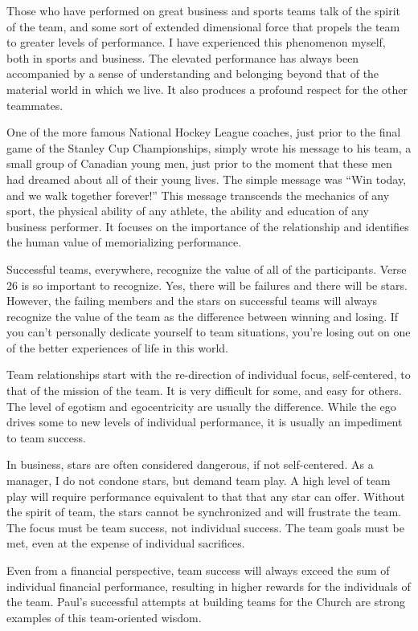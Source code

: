 \documentclass[12pt]{memoir}
\begin{document}
Those who have performed on great business and sports teams talk of
the spirit of the team, and some sort of extended dimensional
force that propels the team to greater levels of performance. I have
experienced this phenomenon myself, both in sports and business. The
elevated performance has always been accompanied by a sense of understanding
and belonging beyond that of the material world in which we live.
It also produces a profound respect for the other teammates.

One of the more famous National Hockey League coaches, just prior
to the final game of the Stanley Cup Championships, simply wrote his
message to his team, a small group of Canadian young men, just prior
to the moment that these men had dreamed about all of their young
lives. The simple message was ``Win today, and we walk together forever!''
This message transcends the mechanics of any sport, the physical ability
of any athlete, the ability and education of any business performer.
It focuses on the importance of the relationship and identifies the
human value of memorializing performance.

Successful teams, everywhere, recognize the value of all of the participants.
Verse 26 is so important to recognize. Yes, there will be failures and there will be stars. However, the failing members and the
stars on successful teams will always recognize the value of the team as the difference between winning and losing. If you can't
personally dedicate yourself to team situations, you're losing out
on one of the better experiences of life in this world.

Team relationships start with the re-direction of individual focus,
self-centered, to that of the mission of the team. It is very difficult
for some, and easy for others. The level of egotism and egocentricity
are usually the difference. While the ego drives some to new levels
of individual performance, it is usually an impediment to team success.

In business, stars are often considered dangerous, if not self-centered.
As a manager, I do not condone stars, but demand
team play. A high level of team play will require performance equivalent
to that that any star can offer. Without the spirit of team, the stars cannot be synchronized and will frustrate
the team. The focus must be team success, not individual success.
The team goals must be met, even at the expense of individual sacrifices.

Even from a financial perspective, team success will always exceed
the sum of individual financial performance, resulting in higher rewards
for the individuals of the team.
Paul's successful attempts at building
teams for the Church are strong examples of this team-oriented wisdom.
\end{document}
